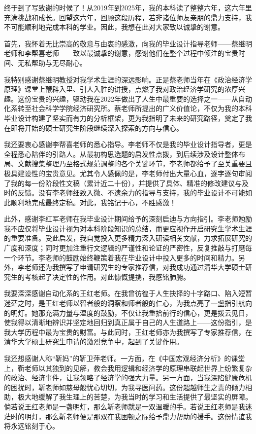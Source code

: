 
\begin{acknowledgements}

终于到了写致谢的时候了！从2019年到2025年，我的本科读了整整六年，这六年里充满挑战和成长。回望这六年，回顾这段历程，若非诸位师友亲朋的鼎力支持，我不可能顺利地完成本科的学业。因此，我想在此对大家致以诚挚的谢意。

​首先，我怀着无比崇高的敬意与由衷的感激，向我的毕业设计指导老师——蔡继明老师和李帮喜老师——致以最诚挚的谢意，感谢他们在整个过程中倾注的宝贵时间、无私帮助与无尽耐心。

我特别感谢蔡继明教授对我学术生涯的深远影响。正是蔡老师当年在《政治经济学原理》课堂上鞭辟入里、引人入胜的讲授，点燃了我对政治经济学研究的浓厚兴趣。这份宝贵的兴趣，驱动我在2022年做出了人生中最重要的选择之一——从自动化系转至社会科学学院经济研究所。蔡老师所提出的广义价值论，不仅为我的本科毕业设计构建了坚实而有力的分析框架，更为我指明了未来的研究路径，奠定了我在即将开始的硕士研究生阶段继续深入探索的方向与信心。

我还要衷心感谢李帮喜老师的悉心指导。李老师不仅是我的毕业设计指导者，更是全程悉心陪伴的引路人。从最初构思选题的启发性点拨，到后续涉及设计整体布局、文献搜集整理乃至格式规范调整的各个关键环节，李老师都给予了至关重要且极具建设性的宝贵意见。尤其令人感佩的是，李老师付出大量心血，逐字逐句审阅了我的每一份阶段性文稿（累计近二十份），并提供了具体、精准的修改建议与及时的反馈。没有李老师细致入微、不遗余力的指导与支持，我的毕业设计不可能如此顺利地完成最终定稿。对此，我铭记于心，不胜感激！​

此外，感谢李红军老师在我毕业设计期间给予的深刻启迪与方向指引。李老师勉励我不应仅将毕业设计视为对本科阶段知识的总结，而更应视作开启研究生学术生涯的重要准备。受此启发，我自觉投入更多精力深入研读相关文献，力求拓展研究的广度和深度；同时更加注重行文逻辑的严谨性和论证的严密性，反复推敲与打磨每一个环节。李老师的鼓励始终鞭策着我在毕业设计中投入更多的时间和精力。​另外，李老师还为我撰写了申请研究生的专家推荐信，对我成功通过清华大学硕士研究生的考核起了决定性的作用。对此慷慨提携，我感铭肺腑。

我要深深感谢自动化系的王红老师。在我曾彷徨于人生抉择的十字路口、陷入短暂迷茫之时，是王红老师以智者般的洞察和师者般的仁心，为我点亮了一盏指引航向的明灯。她那充满力量与温度的鼓励，不仅让我重拾前行的信心，更是拨云见日，使我得以清晰地辨识并坚定地回归到真正属于自己的人生道路上——这份指引，是我大学历程中最为宝贵的财富。与此同时，王红老师亦为我撰写了专家推荐信，在清华大学硕士研究生申请的激烈竞争中，起到了关键作用。

我还想感谢人称“靳妈”的靳卫萍老师。一方面，在《中国宏观经济分析》的课堂上，靳老师以其独到的见解，教会我用逻辑和经济学的原理串联起世界上纷繁复杂的政治、经济事件，让我领略了经济学的强大力量。另一方面，当我深陷健康危机的困扰时，靳老师如慈母般忧心切切，为我寻医问药。这份超越师生之责的倾力相助，极大地缓解了我生理上的苦楚，为我当时的学习和生活提供了最坚实的屏障。倘若说王红老师是一盏明灯，那么靳老师就是一双温暖的手。若说王红老师是我迷茫时的明灯，那么靳老师便是那双在我困顿之际给予鼎力帮助的援手。这份情谊我将永远铭刻于心。​


\end{acknowledgements}

